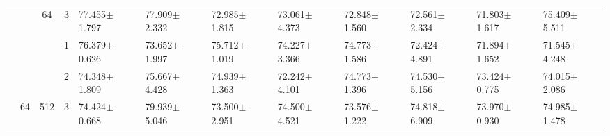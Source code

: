 \begin{table}[htpb]
{\begin{tabular}{c|c|c|c|ll|ll|ll|ll}
                                 &                                                                                 & \multirow{-3}{*}{64}                                                                   & 3                                                                                         & 77.455$\pm$1.797                        & 77.909$\pm$2.332                        & 72.985$\pm$1.815                        & 73.061$\pm$4.373                        & 72.848$\pm$1.560                        & 72.561$\pm$2.334                        & 71.803$\pm$1.617                        & 75.409$\pm$5.511                       \\ \cline{3-12} 
                                 &                                                                                 &                                                                                        & 1                                                                                         & 76.379$\pm$0.626                        & 73.652$\pm$1.997                        & 75.712$\pm$1.019                        & 74.227$\pm$3.366                        & 74.773$\pm$1.586                        & 72.424$\pm$4.891                        & 71.894$\pm$1.652                        & 71.545$\pm$4.248                       \\
                                 &                                                                                 &                                                                                        & 2                                                                                         & 74.348$\pm$1.809                        & 75.667$\pm$4.428                        & 74.939$\pm$1.363                        & 72.242$\pm$4.101                        & 74.773$\pm$1.396                        & 74.530$\pm$5.156                        & 73.424$\pm$0.775                        & 74.015$\pm$2.086                       \\
                                 & \multirow{-6}{*}{64}                                                            & \multirow{-3}{*}{512}                                                                  & 3                                                                                         & 74.424$\pm$0.668                        & 79.939$\pm$5.046                        & 73.500$\pm$2.951                        & 74.500$\pm$4.521                        & 73.576$\pm$1.222                        & 74.818$\pm$6.909                        & 73.970$\pm$0.930                        & 74.985$\pm$1.478                       \\ \cline{2-12} 

\end{tabular}}
\end{table}
